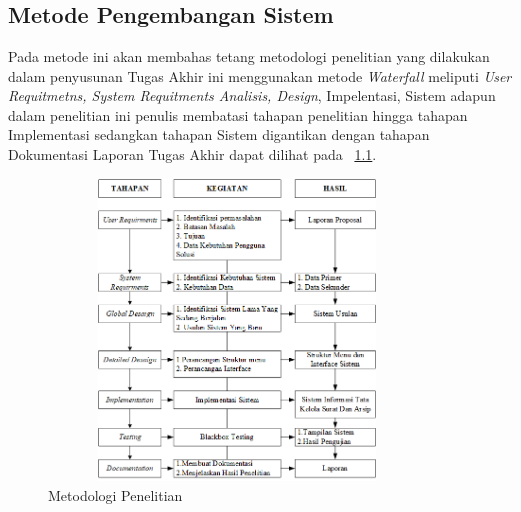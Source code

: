 %
%
%
%


\chapter{\babTiga}


\section{Metode Pengembangan Sistem}

Pada metode ini akan membahas tetang metodologi penelitian yang dilakukan dalam penyusunan Tugas Akhir ini menggunakan metode \textit{Waterfall} meliputi \textit{User Requitmetns, System Requitments Analisis, Design}, Impelentasi, Sistem adapun dalam penelitian ini penulis membatasi tahapan penelitian hingga tahapan Implementasi sedangkan tahapan Sistem digantikan dengan tahapan Dokumentasi Laporan Tugas Akhir dapat dilihat pada \pic~\ref{gbr301}.


\begin{figure}
	\centering
	\includegraphics [height=8cm, width=10cm]{konten/gambar/gbr301.png}
		\caption{Metodologi Penelitian}
	\label{gbr301}
\end{figure}

